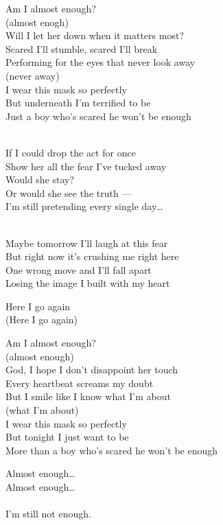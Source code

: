 \begin{lyrics}
Am I almost enough?\\
(almost enogh)\\
Will I let her down when it matters most?\\
Scared I’ll stumble, scared I’ll break\\
Performing for the eyes that never look away\\
(never away)\\
I wear this mask so perfectly\\
But underneath I’m terrified to be\\
Just a boy who’s scared he won’t be enough

\\
If I could drop the act for once\\
Show her all the fear I’ve tucked away\\
Would she stay?\\
Or would she see the truth —\\
I’m still pretending every single day…

\\
Maybe tomorrow I’ll laugh at this fear\\
But right now it’s crushing me right here\\
One wrong move and I’ll fall apart\\
Losing the image I built with my heart

Here I go again\\
(Here I go again)

Am I almost enough?\\
(almost enough)\\
God, I hope I don’t disappoint her touch\\
Every heartbeat screams my doubt\\
But I smile like I know what I’m about\\
(what I'm about)\\
I wear this mask so perfectly\\
But tonight I just want to be\\
More than a boy who’s scared he won’t be enough

Almost enough…\\
Almost enough…\\
\\
I’m still not enough.

\end{lyrics}

